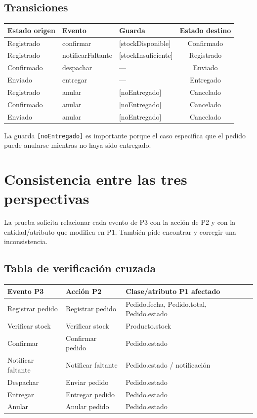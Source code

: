 \documentclass[12pt,a4paper]{article}
\begin{document}
\subsection*{Transiciones}

\begin{center}
\small
\begin{tabular}{lllc}
\toprule
\textbf{Estado origen} & \textbf{Evento} & \textbf{Guarda} & \textbf{Estado destino} \\
\midrule
Registrado & confirmar & [stockDisponible] & Confirmado \\
Registrado & notificarFaltante & [stockInsuficiente] & Registrado \\
Confirmado & despachar & --- & Enviado \\
Enviado & entregar & --- & Entregado \\
Registrado & anular & [noEntregado] & Cancelado \\
Confirmado & anular & [noEntregado] & Cancelado \\
Enviado & anular & [noEntregado] & Cancelado \\
\bottomrule
\end{tabular}
\end{center}

La guarda \texttt{[noEntregado]} es importante porque el caso especifica que el pedido puede anularse mientras no haya sido entregado.

\section{Consistencia entre las tres perspectivas}

La prueba solicita relacionar cada evento de P3 con la acción de P2 y con la entidad/atributo que modifica en P1. También pide encontrar y corregir una inconsistencia.

\subsection*{Tabla de verificación cruzada}

\begin{center}
\small
\begin{tabular}{lll}
\toprule
\textbf{Evento P3} & \textbf{Acción P2} & \textbf{Clase/atributo P1 afectado} \\
\midrule
Registrar pedido & Registrar pedido & Pedido.fecha, Pedido.total, Pedido.estado \\
Verificar stock & Verificar stock & Producto.stock \\
Confirmar & Confirmar pedido & Pedido.estado \\
Notificar faltante & Notificar faltante & Pedido.estado / notificación \\
Despachar & Enviar pedido & Pedido.estado \\
Entregar & Entregar pedido & Pedido.estado \\
Anular & Anular pedido & Pedido.estado \\
\bottomrule
\end{tabular}
\end{center}
\end{document}
